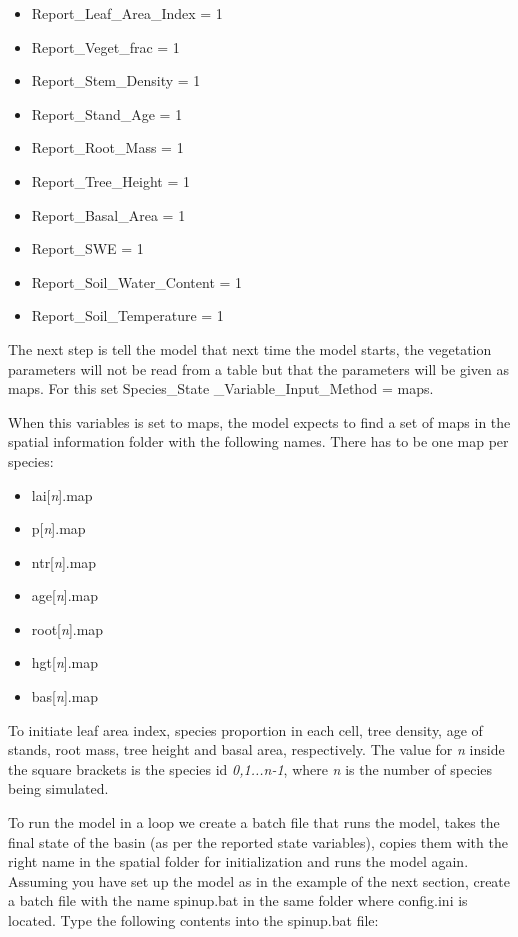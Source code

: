\begin{itemize}

\item Report\_Leaf\_Area\_Index = 1
\item Report\_Veget\_frac = 1
\item Report\_Stem\_Density = 1
\item Report\_Stand\_Age = 1
\item Report\_Root\_Mass = 1
\item Report\_Tree\_Height = 1
\item Report\_Basal\_Area = 1
\item Report\_SWE = 1
\item Report\_Soil\_Water\_Content = 1 
\item Report\_Soil\_Temperature = 1

\end{itemize}

The next step is tell the model that next time the model starts, the vegetation parameters will not be read from a table but that the parameters will be given as maps. For this set \textsf{Species\_State \_Variable\_Input\_Method = maps}.

When this variables is set to \textsf{maps}, the model expects to find a set of maps in the spatial information folder with the following names. There has to be one map per species:

\begin{itemize}

\item lai[\textit{n}].map
\item p[\textit{n}].map
\item ntr[\textit{n}].map
\item age[\textit{n}].map
\item root[\textit{n}].map
\item hgt[\textit{n}].map
\item bas[\textit{n}].map

\end{itemize}

To initiate leaf area index, species proportion in each cell, tree density, age of stands, root mass, tree height and basal area, respectively. The value for \textsf{\textit{n}} inside the square brackets is the species id \textsf{\textit{0,1...n-1}}, where \textsf{\textit{n}} is the number of species being simulated.     

To run the model in a loop we create a batch file that runs the model, takes the final state of the basin (as per the reported state variables), copies them with the right name in the spatial folder for initialization and runs the model again. Assuming you have set up the model as in the example of the next section, create a batch file with the name \textsf{spinup.bat} in the same folder where \textsf{config.ini} is located. Type the following contents into the \textsf{spinup.bat} file: 

